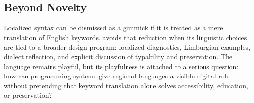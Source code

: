 \subsection{Beyond Novelty}

Localized syntax can be dismissed as a gimmick if it is treated as a mere
translation of English keywords. \plat{} avoids that reduction when its
linguistic choices are tied to a broader design program: localized diagnostics,
Limburgian examples, dialect reflection, and explicit discussion of typability
and preservation. The language remains playful, but its playfulness is attached
to a serious question: how can programming systems give regional languages a
visible digital role without pretending that keyword translation alone solves
accessibility, education, or preservation?

